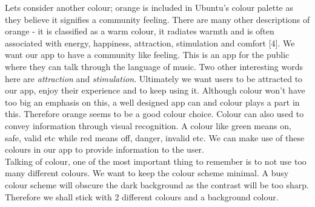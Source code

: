 Lets consider another colour; orange is included in Ubuntu's colour palette as they believe it signifies a community feeling.  There are many other descriptions of orange - it is classified as a warm colour, it radiates warmth and is often associated with energy, happiness, attraction, stimulation and comfort [4].  We want our app to have a community like feeling.  This is an app for the public where they can talk through the language of music.  Two other interesting words here are \emph{attraction} and \emph{stimulation}.  Ultimately we want users to be attracted to our app, enjoy their experience and to keep using it.  Although colour won't have too big an emphasis on this, a well designed app can and colour plays a part in this.  Therefore orange seems to be a good colour choice.  
Colour can also used to convey information through visual recognition.  A colour like green means on, safe, valid etc while red means off, danger, invalid etc.  We can make use of these colours in our app to provide information to the user.  \\
Talking of colour, one of the most important thing to remember is to not use too many different colours.  We want to keep the colour scheme minimal.  A busy colour scheme will obscure the dark background as the contrast will be too sharp.  Therefore we shall stick with 2 different colours and a background colour.  \\

